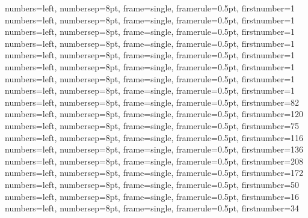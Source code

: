 {numbers=left, numbersep=8pt, frame=single, framerule=0.5pt, firstnumber=1}
{numbers=left, numbersep=8pt, frame=single, framerule=0.5pt, firstnumber=1}
{numbers=left, numbersep=8pt, frame=single, framerule=0.5pt, firstnumber=1}
{numbers=left, numbersep=8pt, frame=single, framerule=0.5pt, firstnumber=1}
{numbers=left, numbersep=8pt, frame=single, framerule=0.5pt, firstnumber=1}
{numbers=left, numbersep=8pt, frame=single, framerule=0.5pt, firstnumber=1}
{numbers=left, numbersep=8pt, frame=single, framerule=0.5pt, firstnumber=1}
{numbers=left, numbersep=8pt, frame=single, framerule=0.5pt, firstnumber=1}
{numbers=left, numbersep=8pt, frame=single, framerule=0.5pt, firstnumber=82}
{numbers=left, numbersep=8pt, frame=single, framerule=0.5pt, firstnumber=120}
{numbers=left, numbersep=8pt, frame=single, framerule=0.5pt, firstnumber=75}
{numbers=left, numbersep=8pt, frame=single, framerule=0.5pt, firstnumber=116}
{numbers=left, numbersep=8pt, frame=single, framerule=0.5pt, firstnumber=136}
{numbers=left, numbersep=8pt, frame=single, framerule=0.5pt, firstnumber=208}
{numbers=left, numbersep=8pt, frame=single, framerule=0.5pt, firstnumber=172}
{numbers=left, numbersep=8pt, frame=single, framerule=0.5pt, firstnumber=50}
{numbers=left, numbersep=8pt, frame=single, framerule=0.5pt, firstnumber=16}
{numbers=left, numbersep=8pt, frame=single, framerule=0.5pt, firstnumber=34}
